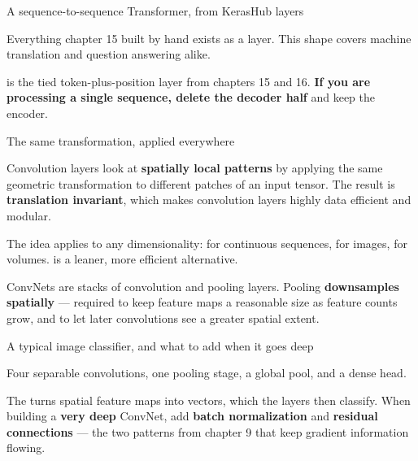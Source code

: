 \documentclass[aspectratio=169,11pt,t]{beamer}
\begin{document}
\begin{frame}[shrink=25]{A sequence-to-sequence Transformer, from KerasHub layers}
{\fontsize{9.4}{12.6}\selectfont\color{fg2}Everything chapter 15 built by hand exists as a layer. This shape covers machine translation and question answering alike.\par}\vskip 4pt
{\fontsize{9.4}{12.6}\selectfont\color{fg2} is the tied token-plus-position layer from chapters 15 and 16. \textbf{If you are processing a single sequence, delete the decoder half} and keep the encoder.\par}\vskip 4pt
\end{frame}

\begin{frame}[shrink=25]{The same transformation, applied everywhere}
{\fontsize{9.4}{12.6}\selectfont\color{fg2}Convolution layers look at \textbf{spatially local patterns} by applying the same geometric transformation to different patches of an input tensor. The result is \textbf{translation invariant}, which makes convolution layers highly data efficient and modular.\par}\vskip 4pt
{\fontsize{9.4}{12.6}\selectfont\color{fg2}The idea applies to any dimensionality:  for continuous sequences,  for images,  for volumes.  is a leaner, more efficient alternative.\par}\vskip 4pt
{\fontsize{9.4}{12.6}\selectfont\color{fg2}ConvNets are stacks of convolution and pooling layers. Pooling \textbf{downsamples spatially} --- required to keep feature maps a reasonable size as feature counts grow, and to let later convolutions see a greater spatial extent.\par}\vskip 4pt
\end{frame}

\begin{frame}[shrink=25]{A typical image classifier, and what to add when it goes deep}
{\fontsize{9.4}{12.6}\selectfont\color{fg2}Four separable convolutions, one pooling stage, a global pool, and a dense head.\par}\vskip 4pt
{\fontsize{9.4}{12.6}\selectfont\color{fg2}The  turns spatial feature maps into vectors, which the  layers then classify. When building a \textbf{very deep} ConvNet, add \textbf{batch normalization} and \textbf{residual connections} --- the two patterns from chapter 9 that keep gradient information flowing.\par}\vskip 4pt
\end{frame}
\end{document}
